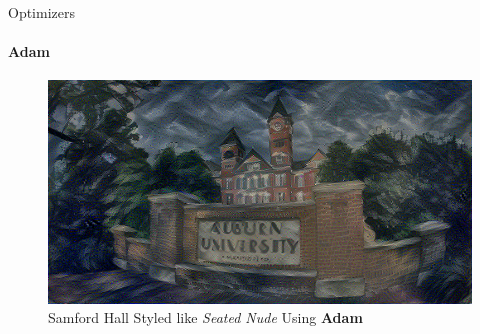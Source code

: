 \documentclass{beamer}
\begin{document}
\begin{frame}{Optimizers}
\framesubtitle{Adam}
\begin{figure}[ht]
\centering
\includegraphics[width=\textwidth]{img/loss/Adam}
\caption*{Samford Hall Styled like \textit{Seated Nude} Using \textbf{Adam}}
\end{figure}
\end{frame}
\end{document}
